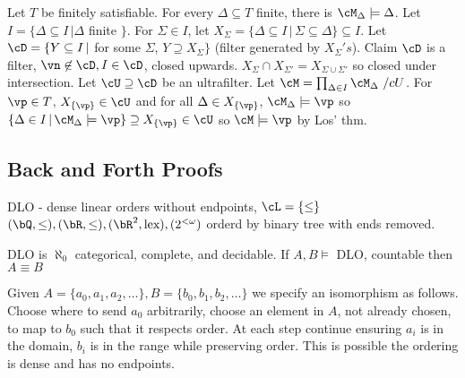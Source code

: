 \begin{pf}
    Let $T$ be finitely satisfiable. For every $\Delta \subseteq T$ finite, there is $\cM_{\Delta} \models \Delta$. Let $I = \{ \Delta \subseteq I \, | \Delta$ finite $\}$. For $\Sigma \in I$, let $X_{\Sigma} = \{\Delta \subseteq I \, | \, \Sigma \subseteq \Delta\} \subseteq I$. Let $\cD = \{Y \subseteq I \, |$ for some $\Sigma$, $Y \supseteq X_{\Sigma}\}$ (filter generated by $X_{\Sigma}'s$). Claim $\cD$ is a filter, $\vn \not\in \cD, I \in \cD$, closed upwards. $X_{\Sigma} \cap X_{\Sigma'} = X_{\Sigma \cup \Sigma'}$ so closed under intersection. Let $\cU \supseteq \cD$ be an ultrafilter. Let $\cM = \prod_{\Delta \in I}\cM_{\Delta}\ /cU$. For $\vp \in T$, $X_{\{\vp\}}\in \cU$ and for all $\Delta \in X_{\{\vp\}}$, $\cM_{\Delta} \models \vp$ so $\{ \Delta \in I \, | \, \cM_{\Delta} \models \vp\} \supseteq X_{\{\vp\}} \in \cU$ so $\cM \models \vp$ by Los' thm.
 \end{pf}

\subsection{Back and Forth Proofs}

\begin{example}
    DLO - dense linear orders without endpoints, $\cL = \{\le\}$ \\
    $(\bQ, \le), (\bR, \le), (\bR^2, \text{lex}), (2^{<\omega})$ orderd by binary tree with ends removed. 
\end{example}

\begin{theorem}[Cantor]
    DLO is $\aleph_0$ categorical, complete, and decidable. If $A,B \models$ DLO, countable then $A \equiv B$ 
\end{theorem}

\begin{pf}
    Given $A = \{a_0, a_1, a_2, \ldots \}, B = \{b_0, b_1, b_2, \ldots \}$ we specify an isomorphism as follows. \\
    Choose where to send $a_0$ arbitrarily, choose an element in $A$, not already chosen, to map to $b_0$ such that it respects order. At each step continue ensuring $a_i$ is in the domain, $b_i$ is in the range while preserving order. This is possible the ordering is dense and has no endpoints. 
\end{pf}    